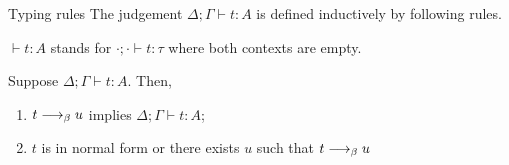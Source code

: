\begin{frame}{Typing rules}
  The judgement $\Delta; \Gamma \vdash t : A$ is defined inductively by following rules.
  \begin{multicols}{2} 
  \begin{prooftree}
  \end{prooftree}
  \begin{prooftree}
  \end{prooftree}
  \begin{prooftree}
  \end{prooftree}
  \color{red}
  \begin{prooftree}
  \end{prooftree}
  \begin{prooftree}
  \end{prooftree}
  \end{multicols}

  $\vdash t : A$ stands for $\cdot ; \cdot \vdash t : \tau$ where both contexts are empty.

  \begin{theorem}
    Suppose $\Delta; \Gamma \vdash t : A$. Then, 
    \begin{enumerate}
      \item $t \onereduce u$ implies $\Delta; \Gamma \vdash t : A$; 
      \item $t$ is in normal form or there exists $u$ such that $t \onereduce u$
    \end{enumerate}
  \end{theorem}
\end{frame}

